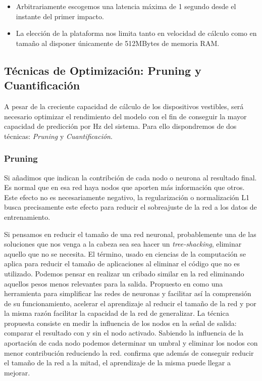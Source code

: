 \begin{itemize}
  \item Arbitrariamente escogemos una latencia máxima de 1 segundo desde el instante del primer impacto.
  \item La elección de la plataforma nos limita tanto en velocidad de cálculo como en tamaño al disponer únicamente de 512MBytes de memoria RAM.
\end{itemize}

\subsection{Técnicas de Optimización: Pruning y Cuantificación}

  A pesar de la creciente capacidad de cálculo de los dispositivos vestibles, será necesario optimizar el rendimiento del modelo con el fin de conseguir la mayor capacidad de predicción por Hz del sistema. Para ello dispondremos de dos técnicas: \textit{Pruning} y \textit{Cuantificación}.

\subsubsection{Pruning}

Si añadimos que indican la contribción de cada nodo o neurona al resultado final. Es normal que en esa red haya nodos que aporten más información que otros. Este efecto no es necesariamente negativo, la regularización o normalización L1 busca precisamente este efecto para reducir el sobreajuste de la red a los datos de entrenamiento.


Si pensamos en reducir el tamaño de una red neuronal, probablemente una de las soluciones que nos venga a la cabeza sea sea hacer un \textit{tree-shacking}, eliminar aquello que no se necesita. El término, usado en ciencias de la computación se aplica para reducir el tamaño de aplicaciones al eliminar el código que no es utilizado. Podemos pensar en realizar un cribado similar en la red eliminando aquellos pesos menos relevantes para la salida. Propuesto en  como una herramienta para simplificar las redes de neuronas y facilitar así la comprensión de su funcionamiento, acelerar el aprendizaje al reducir el tamaño de la red y por la misma razón facilitar la capacidad de la red de generalizar. La técnica propuesta consiste en medir la influencia de los nodos en la señal de salida: comparar el resultado con y sin el nodo activado. Sabiendo la influencia de la aportación de cada nodo podemos determinar un umbral y eliminar los nodos con menor contribución reduciendo la red.  confirma que además de conseguir reducir el tamaño de la red a la mitad, el aprendizaje de la misma puede llegar a mejorar.



